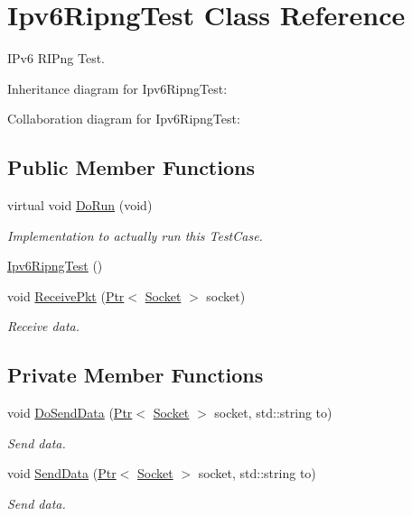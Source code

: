 \hypertarget{classIpv6RipngTest}{}\section{Ipv6\+Ripng\+Test Class Reference}
\label{classIpv6RipngTest}


I\+Pv6 R\+I\+Png Test.  




Inheritance diagram for Ipv6\+Ripng\+Test\+:


Collaboration diagram for Ipv6\+Ripng\+Test\+:
\subsection*{Public Member Functions}
\begin{DoxyCompactItemize}
\item 
virtual void \hyperlink{classIpv6RipngTest_a17887a8153acca820752d31c2b49ac50}{Do\+Run} (void)
\begin{DoxyCompactList}\small\item\em Implementation to actually run this Test\+Case. \end{DoxyCompactList}\item 
\hyperlink{classIpv6RipngTest_aa5354b65c3472fa301e228989bc25b99}{Ipv6\+Ripng\+Test} ()
\item 
void \hyperlink{classIpv6RipngTest_abc3bbb1d39e039609dde2124622bbf0b}{Receive\+Pkt} (\hyperlink{classns3_1_1Ptr}{Ptr}$<$ \hyperlink{classns3_1_1Socket}{Socket} $>$ socket)
\begin{DoxyCompactList}\small\item\em Receive data. \end{DoxyCompactList}\end{DoxyCompactItemize}
\subsection*{Private Member Functions}
\begin{DoxyCompactItemize}
\item 
void \hyperlink{classIpv6RipngTest_aa42141ba9074832b8952c66a751392c4}{Do\+Send\+Data} (\hyperlink{classns3_1_1Ptr}{Ptr}$<$ \hyperlink{classns3_1_1Socket}{Socket} $>$ socket, std\+::string to)
\begin{DoxyCompactList}\small\item\em Send data. \end{DoxyCompactList}\item 
void \hyperlink{classIpv6RipngTest_a93e154807a5f1b10e4d6fbc1dded827b}{Send\+Data} (\hyperlink{classns3_1_1Ptr}{Ptr}$<$ \hyperlink{classns3_1_1Socket}{Socket} $>$ socket, std\+::string to)
\begin{DoxyCompactList}\small\item\em Send data. \end{DoxyCompactList}\end{DoxyCompactItemize}
